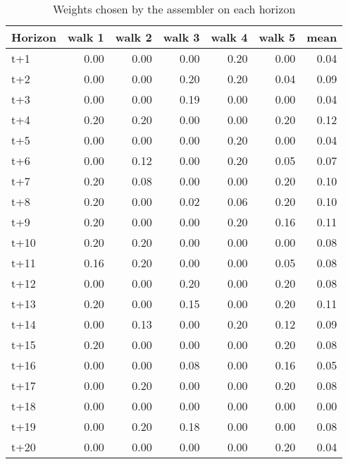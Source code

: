\begin{table}[H]
\centering
\caption{Weights chosen by the assembler on each horizon}
\label{tab:weights_assembler}
\begin{tabular}{lrrrrrr}
\toprule
Horizon &  walk 1 &  walk 2 &  walk 3 &  walk 4 &  walk 5 &  mean \\
\midrule
t+1  &    0.00 &    0.00 &    0.00 &    0.20 &    0.00 &  0.04 \\
t+2  &    0.00 &    0.00 &    0.20 &    0.20 &    0.04 &  0.09 \\
t+3  &    0.00 &    0.00 &    0.19 &    0.00 &    0.00 &  0.04 \\
t+4  &    0.20 &    0.20 &    0.00 &    0.00 &    0.20 &  0.12 \\
t+5  &    0.00 &    0.00 &    0.00 &    0.20 &    0.00 &  0.04 \\
t+6  &    0.00 &    0.12 &    0.00 &    0.20 &    0.05 &  0.07 \\
t+7  &    0.20 &    0.08 &    0.00 &    0.00 &    0.20 &  0.10 \\
t+8  &    0.20 &    0.00 &    0.02 &    0.06 &    0.20 &  0.10 \\
t+9  &    0.20 &    0.00 &    0.00 &    0.20 &    0.16 &  0.11 \\
t+10 &    0.20 &    0.20 &    0.00 &    0.00 &    0.00 &  0.08 \\
t+11 &    0.16 &    0.20 &    0.00 &    0.00 &    0.05 &  0.08 \\
t+12 &    0.00 &    0.00 &    0.20 &    0.00 &    0.20 &  0.08 \\
t+13 &    0.20 &    0.00 &    0.15 &    0.00 &    0.20 &  0.11 \\
t+14 &    0.00 &    0.13 &    0.00 &    0.20 &    0.12 &  0.09 \\
t+15 &    0.20 &    0.00 &    0.00 &    0.00 &    0.20 &  0.08 \\
t+16 &    0.00 &    0.00 &    0.08 &    0.00 &    0.16 &  0.05 \\
t+17 &    0.00 &    0.20 &    0.00 &    0.00 &    0.20 &  0.08 \\
t+18 &    0.00 &    0.00 &    0.00 &    0.00 &    0.00 &  0.00 \\
t+19 &    0.00 &    0.20 &    0.18 &    0.00 &    0.00 &  0.08 \\
t+20 &    0.00 &    0.00 &    0.00 &    0.00 &    0.20 &  0.04 \\
\bottomrule
\end{tabular}
\end{table}
